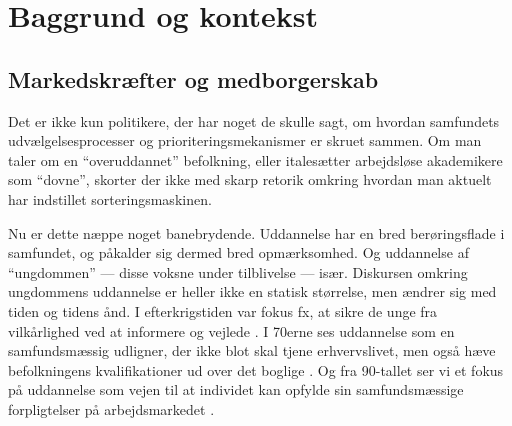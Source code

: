 \renewcommand*{\afterpartskip}{
\vfil\epigraph{\itshape
Danmark mangler allerede nu kvalificeret arbejdskraft, og manglen vil vokse markant de kommende år. Tal fra Arbejderbevægelsens Erhvervsråd viser, at der de kommende ti år vil komme til at mangle omkring 70.000 faglærte. Alene jern- og metalindustriend vil mangle 30.000 faglærte, og tæller vi handels- og kontorområdet med, kan vi lægge yderligere 12.000 oven i. Udover faglærte vil der komme til at mangle flere end 60.000 personer med korte og mellemlange videregående uddannelser.

Samtidig vil omkring 55.000 personer med en lang videregående uddannelse være i overskud i år 2030.
}
{Claus Jensen, forbundsformand, Dansk Metal og Kim Simonsen, forbundsformand, HK, kronik i Berlingske Tidende, 3.\ april \citeyear{simonsenLadOsGore2016}}
}

\part{Baggrund og kontekst}\label{part:baggrund}

\chapter{Markedskræfter og medborgerskab}\label{chap:marked}

Det er ikke kun politikere, der har noget de skulle sagt, om hvordan samfundets udvælgelsesprocesser og prioriteringsmekanismer er skruet sammen.
Om man taler om en “overuddannet” befolkning, eller italesætter arbejdsløse akademikere som “dovne”, skorter der ikke med skarp retorik omkring hvordan man aktuelt har indstillet sorteringsmaskinen.

Nu er dette næppe noget banebrydende.
Uddannelse har en bred berøringsflade i samfundet, og påkalder sig dermed bred opmærksomhed.
Og uddannelse af “ungdommen” — disse voksne under tilblivelse — især.
Diskursen omkring ungdommens uddannelse er heller ikke en statisk størrelse, men ændrer sig med tiden og tidens ånd.
I efterkrigstiden var fokus fx, at sikre de unge fra vilkårlighed ved at informere og vejlede \autocite[s 17ff]{juulDiskurserOmUngdom2013}.
I 70erne ses uddannelse som en samfundsmæssig udligner, der ikke blot skal tjene erhvervslivet, men også hæve befolkningens kvalifikationer ud over det boglige \autocite[s 15ff]{juulDiskurserOmUngdom2013}.
Og fra 90-tallet ser vi et fokus på uddannelse som vejen til at individet kan opfylde sin samfundsmæssige forpligtelser på arbejdsmarkedet \autocite[s. 18]{juulDiskurserOmUngdom2013}.

